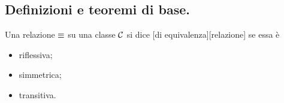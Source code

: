 \subsection{Definizioni e teoremi di base.}\label{DefinizioniETeoremiDiBaseOrdini}
\begin{Definition}
	Una relazione $\equiv$ su una classe $\mathcal{C}$ si dice [di equivalenza][relazione] se essa \`e
	\begin{itemize}
		\item riflessiva;
		\item simmetrica;
		\item transitiva.
	\end{itemize}
\end{Definition}
